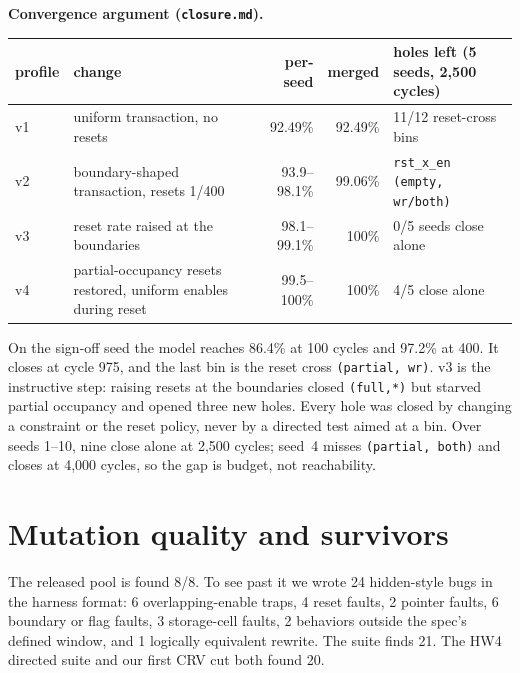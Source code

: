 \documentclass[10pt]{article}
\newcommand{\code}[1]{\texttt{#1}}
\begin{document}
\noindent\begin{minipage}{\linewidth}
\textbf{Convergence argument (\code{closure.md}).}
\begin{center}\small
\begin{tabular}{lp{5.6cm}rrp{4.2cm}}
\toprule
profile & change & per-seed & merged & holes left (5 seeds, 2,500 cycles)\\
\midrule
v1 & uniform transaction, no resets & 92.49\% & 92.49\% & 11/12 reset-cross bins\\
v2 & boundary-shaped transaction, resets 1/400 & 93.9--98.1\% & 99.06\% & \code{rst\_x\_en (empty, wr/both)}\\
v3 & reset rate raised at the boundaries & 98.1--99.1\% & 100\% & 0/5 seeds close alone\\
v4 & partial-occupancy resets restored, uniform enables during reset & 99.5--100\% & 100\% & 4/5 close alone\\
\bottomrule
\end{tabular}
\end{center}
\end{minipage}
On the sign-off seed the model reaches 86.4\% at 100 cycles and 97.2\% at 400. It closes at cycle 975, and the last bin is the reset cross \code{(partial, wr)}. v3 is the instructive step: raising resets at the boundaries closed \code{(full,*)} but starved partial occupancy and opened three new holes. Every hole was closed by changing a constraint or the reset policy, never by a directed test aimed at a bin. Over seeds 1--10, nine close alone at 2,500 cycles; seed~4 misses \code{(partial, both)} and closes at 4,000 cycles, so the gap is budget, not reachability.

\section{Mutation quality and survivors}\label{sec:mut}
The released pool is found 8/8. To see past it we wrote 24 hidden-style bugs in the harness format: 6 overlapping-enable traps, 4 reset faults, 2 pointer faults, 6 boundary or flag faults, 3 storage-cell faults, 2 behaviors outside the spec's defined window, and 1 logically equivalent rewrite. The suite finds 21. The HW4 directed suite and our first CRV cut both found 20.
\end{document}
